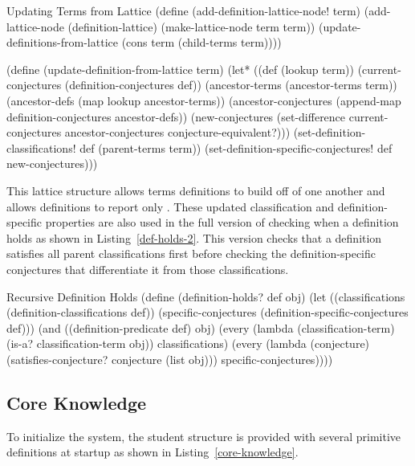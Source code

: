 \begin{code-listing}
[label=updating-terms]
{Updating Terms from Lattice}
(define (add-definition-lattice-node! term)
  (add-lattice-node (definition-lattice) (make-lattice-node term term))
  (update-definitions-from-lattice (cons term (child-terms term))))

(define (update-definition-from-lattice term)
  (let* ((def (lookup term))
         (current-conjectures (definition-conjectures def))
         (ancestor-terms (ancestor-terms term))
         (ancestor-defs (map lookup ancestor-terms))
         (ancestor-conjectures
          (append-map definition-conjectures ancestor-defs))
         (new-conjectures
          (set-difference current-conjectures
                          ancestor-conjectures
                          conjecture-equivalent?)))
    (set-definition-classifications! def (parent-terms term))
    (set-definition-specific-conjectures! def new-conjectures)))
\end{code-listing}

This lattice structure allows terms definitions to build off of one
another and allows definitions to report only . These updated
classification and definition-specific properties are also used in the
full version of checking when a definition holds as shown in
Listing~\ref{def-holds-2}. This version checks that a definition
satisfies all parent classifications first before checking the
definition-specific conjectures that differentiate it from those
classifications.

\begin{code-listing}
[label=def-holds-2]
{Recursive Definition Holds}
(define (definition-holds? def obj)
  (let ((classifications (definition-classifications def))
        (specific-conjectures (definition-specific-conjectures def)))
    (and ((definition-predicate def) obj)
         (every (lambda (classification-term)
                  (is-a? classification-term obj))
                classifications)
         (every (lambda (conjecture)
                  (satisfies-conjecture? conjecture (list obj)))
                specific-conjectures))))
\end{code-listing}

\subsection{Core Knowledge}

To initialize the system, the student structure is provided with
several primitive definitions at startup as shown in
Listing~\ref{core-knowledge}.


